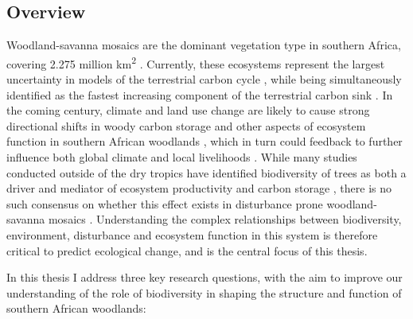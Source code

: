 \begin{refsection}


\chapter[\chaptertitle]{\chaptertitle}
\label{ch:intro}

\section{Overview}
\label{intro:sec:overview}

Woodland-savanna mosaics are the dominant vegetation type in southern Africa, covering \textapprox{}2.275 million km\textsuperscript{2} \citep{Arino2010}. Currently, these ecosystems represent the largest uncertainty in models of the terrestrial carbon cycle \citep{Ahlstrom2015}, while being simultaneously identified as the fastest increasing component of the terrestrial carbon sink \citep{Sitch2015}. In the coming century, climate and land use change are likely to cause strong directional shifts in woody carbon storage and other aspects of ecosystem function in southern African woodlands \citep{Midgley2011, Giannecchini2007, Scholze2006}, which in turn could feedback to further influence both global climate and local livelihoods \citep{Jew2016, Kalema2015}. While many studies conducted outside of the dry tropics have identified biodiversity of trees as both a driver and mediator of ecosystem productivity and carbon storage \citep{Liang2016}, there is no such consensus on whether this effect exists in disturbance prone woodland-savanna mosaics \citep{Mensah2020, Shirima2015a, McNicol2018a, Loiola2015}. Understanding the complex relationships between biodiversity, environment, disturbance and ecosystem function in this system is therefore critical to predict ecological change, and is the central focus of this thesis.

In this thesis I address three key research questions, with the aim to improve our understanding of the role of biodiversity in shaping the structure and function of southern African woodlands:


\end{refsection}
